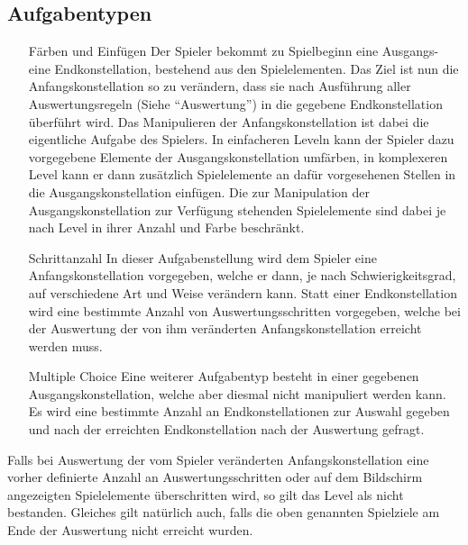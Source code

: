 \subsection{Aufgabentypen}
        \begin{itemize}
                \item[Färben und Einfügen] Der Spieler bekommt zu Spielbeginn eine Ausgangs- eine Endkonstellation, bestehend aus den Spielelementen.
                Das Ziel ist nun die Anfangskonstellation so zu verändern, dass sie nach Ausführung aller Auswertungsregeln (Siehe "`Auswertung"') in die gegebene Endkonstellation überführt wird.
                Das Manipulieren der Anfangskonstellation ist dabei die eigentliche Aufgabe des Spielers.
                In einfacheren Leveln kann der Spieler dazu vorgegebene Elemente der Ausgangskonstellation umfärben, in komplexeren Level kann er dann zusätzlich Spielelemente an dafür vorgesehenen Stellen in die Ausgangskonstellation einfügen. 
                Die zur Manipulation der Ausgangskonstellation zur Verfügung stehenden Spielelemente sind dabei je nach Level in ihrer Anzahl und Farbe beschränkt.

                \item[Schrittanzahl] In dieser Aufgabenstellung wird dem Spieler eine Anfangskonstellation vorgegeben, welche er dann, je nach Schwierigkeitsgrad, auf verschiedene Art und Weise verändern kann.
                Statt einer Endkonstellation wird eine bestimmte Anzahl von Auswertungsschritten vorgegeben, welche bei der Auswertung der von ihm veränderten Anfangskonstellation erreicht werden muss.

                \item[Multiple Choice] Eine weiterer Aufgabentyp besteht in einer gegebenen Ausgangskonstellation, welche aber diesmal nicht manipuliert werden kann. 
                Es wird eine bestimmte Anzahl an Endkonstellationen zur Auswahl gegeben und nach der erreichten Endkonstellation nach der Auswertung gefragt.

        \end{itemize}

        Falls bei Auswertung der vom Spieler veränderten Anfangskonstellation eine vorher definierte Anzahl an Auswertungsschritten oder auf dem Bildschirm angezeigten Spielelemente überschritten wird, so gilt das Level als nicht bestanden. 
        Gleiches gilt natürlich auch, falls die oben genannten Spielziele am Ende der Auswertung nicht erreicht wurden.
        

